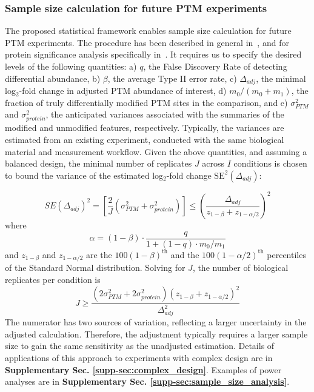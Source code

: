 \documentclass[mcp]{article}
\numberwithin{table}{section}
\begin{document}
\subsubsection*{Sample size calculation for future PTM experiments}
\label{sec:design}

The proposed statistical framework enables sample size calculation for future PTM experiments. 
The procedure has been described in general in~\cite{kutner_etal_04a}, and for protein significance analysis specifically in~\cite{oberg_vitek_09a}. 
It requires us to specify the desired levels of the following quantities: a) $q$, the False Discovery Rate of detecting differential abundance, b) $\beta$, the average Type II error rate, c) $\Delta_{adj}$, the minimal log$_2$-fold change in adjusted PTM abundance  of interest, d) $m_0 / (m_0 + m_1)$, the fraction of truly differentially modified PTM sites in the comparison, and e) $\sigma_{PTM}^{2}$ and $\sigma_{protein}^{2}$, the anticipated variances associated with the summaries of the modified and unmodified features, respectively. Typically, the variances are estimated from an existing experiment, conducted with the same biological material and measurement workflow. Given the above quantities, and assuming a balanced design, the minimal number of replicates $J$ across $I$ conditions is chosen to bound the variance of the estimated log$_2$-fold change $\mathrm{SE}^{2}(\Delta_{adj})$:

\begin{equation}
SE(\Delta_{adj})^2 = \left[ \frac{2}{J} \left( \sigma_{PTM}^{2} + \sigma_{protein}^{2} \right) \right]
\leq \left( \frac{\Delta_{adj}}{z_{1-\beta} + z_{1-\alpha /2}} \right)^{2}
\end{equation}
where 
\begin{equation}
\alpha = (1 - \beta) \cdot \frac{q}{1 + (1-q) \cdot m_0 / m_1}
\end{equation}
and $z_{1-\beta}$ and $z_{1-\alpha /2}$ are the $100(1-\beta)^{\text{th}}$ and the $100(1-\alpha /2)^{\text{th}}$ percentiles of the Standard Normal distribution.  Solving for $J$, the number of biological replicates per condition is
\begin{equation}
J \geq \frac{(2\sigma_{PTM}^{2} + 2\sigma_{protein}^{2})(z_{1-\beta} + z_{1-\alpha /2})^2}{\Delta_{adj}^2}
\end{equation}
The numerator has two sources of variation, reflecting a larger uncertainty in the adjusted calculation. Therefore, the adjustment typically requires a larger sample size to gain the same sensitivity as the unadjusted estimation. Details of applications of this approach to experiments with complex design are in {\bf Supplementary Sec. \ref{supp-sec:complex_design}}. Examples of power analyses are in {\bf Supplementary Sec. \ref{supp-sec:sample_size_analysis}}.
\end{document}
